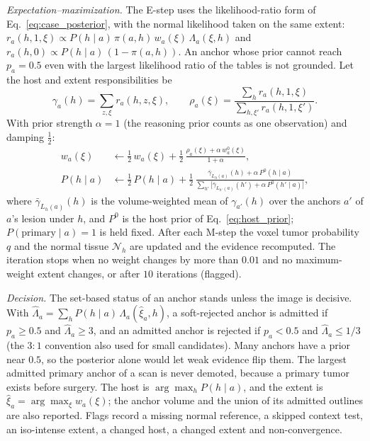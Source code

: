 \documentclass[fleqn,10pt]{olplainarticle}
\begin{document}
\emph{Expectation--maximization.} The E-step uses the likelihood-ratio form of Eq.~\eqref{eq:case_posterior}, with the normal
likelihood taken on the same extent: $r_a(h,1,\xi)\propto P(h\mid a)\,\pi(a,h)\,w_a(\xi)\,\Lambda_a(\xi,h)$ and
$r_a(h,0)\propto P(h\mid a)\,(1-\pi(a,h))$. An anchor whose prior cannot reach $p_a=0.5$ even with the largest likelihood ratio of
the tables is not grounded. Let the host and extent responsibilities be
\begin{equation*}
\gamma_a(h)=\sum_{z,\xi}r_a(h,z,\xi),\qquad
\rho_a(\xi)=\frac{\sum_h r_a(h,1,\xi)}{\sum_{h,\xi'}r_a(h,1,\xi')}.
\end{equation*}
With prior strength $\alpha=1$ (the reasoning prior counts as one observation) and damping $\tfrac12$:
\begin{equation}
\label{eq:mstep}
\begin{aligned}
w_a(\xi)&\leftarrow\tfrac12\,w_a(\xi)+\tfrac12\,\frac{\rho_a(\xi)+\alpha\,w^{0}_a(\xi)}{1+\alpha},\\
P(h\mid a)&\leftarrow\tfrac12\,P(h\mid a)+\tfrac12\,\frac{\bar\gamma_{L_h(a)}(h)+\alpha\,P^{0}(h\mid a)}{\sum_{h'}\bigl[\bar\gamma_{L_{h'}(a)}(h')+\alpha\,P^{0}(h'\mid a)\bigr]},
\end{aligned}
\end{equation}
where $\bar\gamma_{L_h(a)}(h)$ is the volume-weighted mean of $\gamma_{a'}(h)$ over the anchors $a'$ of $a$'s lesion under $h$, and
$P^{0}$ is the host prior of Eq.~\eqref{eq:host_prior}; $P(\text{primary}\mid a)=1$ is held fixed. After each M-step the voxel
tumor probability $q$ and the normal tissue $\mathcal{N}_h$ are updated and the evidence recomputed. The iteration stops when no
weight changes by more than $0.01$ and no maximum-weight extent changes, or after $10$ iterations (flagged).

\emph{Decision.} The set-based status of an anchor stands unless the image is decisive. With
$\hat\Lambda_a=\sum_h P(h\mid a)\,\Lambda_a(\hat\xi_a,h)$, a soft-rejected anchor is admitted if $p_a\ge0.5$ and $\hat\Lambda_a\ge3$, and
an admitted anchor is rejected if $p_a<0.5$ and $\hat\Lambda_a\le1/3$ (the $3{:}1$ convention also used for small candidates).
Many anchors have a prior near $0.5$, so the posterior alone would let weak evidence flip them. The largest admitted primary
anchor of a scan is never demoted, because a primary tumor exists before surgery.
The host is $\arg\max_h P(h\mid a)$, and the extent is $\hat\xi_a=\arg\max_\xi w_a(\xi)$; the anchor volume and the union of its
admitted outlines are also reported. Flags record a missing normal reference, a skipped context test, an iso-intense extent, a
changed host, a changed extent and non-convergence.
\end{document}
